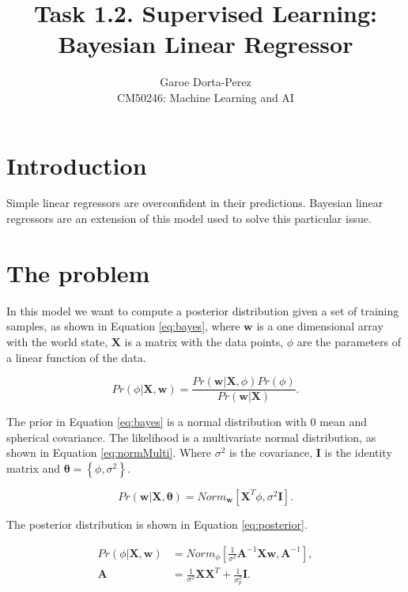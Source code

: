 \documentclass[12pt]{article}
\begin{document}
  
\title{Task 1.2. Supervised Learning:\\ Bayesian Linear Regressor}
\author{Garoe Dorta-Perez\\
CM50246: Machine Learning and AI}
 
\maketitle
 
\section{Introduction}

Simple linear regressors are overconfident in their predictions.
Bayesian linear regressors are an extension of this model used to solve this particular issue.

\section{The problem}

In this model we want to compute a posterior distribution given a set of training samples, as shown in Equation \ref{eq:bayes}, where $\mathbf{w}$ is a one dimensional array with the world state, $\mathbf{X}$ is a matrix with the data points, $\phi$ are the parameters of a linear function of the data.

\begin{equation}
\label{eq:bayes}
Pr(\phi | \mathbf{X}, \mathbf{w} ) = \frac{ Pr(\mathbf{w} | \mathbf{X}, \phi) Pr(\phi)} {Pr(\mathbf{w} | \mathbf{X} )}.
\end{equation}

The prior in Equation \ref{eq:bayes} is a normal distribution with 0 mean and spherical covariance.
The likelihood is a multivariate normal distribution, as shown in Equation \ref{eq:normMulti}.
Where  $\sigma^2$ is the covariance, $\mathbf{I}$ is the identity matrix and $\boldsymbol{\theta}= \left\{ \phi, \sigma^2 \right\}$.

\begin{equation}
\label{eq:normMulti}
Pr(\mathbf{w} | \mathbf{X}, \boldsymbol{\theta} ) = Norm_{\mathbf{w}}\left[ \mathbf{X}^T \phi, \sigma^2 \mathbf{I} \right].
\end{equation}

The posterior distribution is shown in Equation \ref{eq:posterior}.

\begin{equation}
\begin{split}
\label{eq:posterior}
Pr(\phi | \mathbf{X}, \mathbf{w} ) &= Norm_{\phi}\left[ \frac{1}{\sigma^2} \mathbf{A}^{-1} \mathbf{X} \mathbf{w}, \mathbf{A}^{-1} \right],\\
\mathbf{A} &= \frac{1}{\sigma^2} \mathbf{X} \mathbf{X}^T + \frac{1}{\sigma^2_p} \mathbf{I}.
\end{split}
\end{equation}
\end{document}
